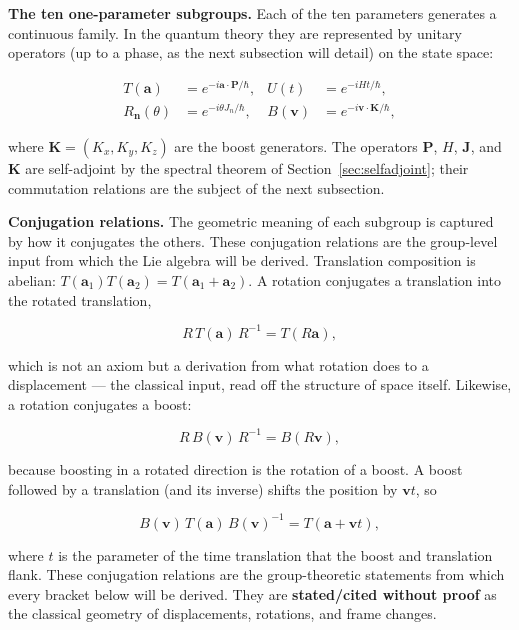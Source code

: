 \medskip\noindent\textbf{The ten one-parameter subgroups.} Each of the ten parameters generates a continuous family. In the quantum theory they are represented by unitary operators (up to a phase, as the next subsection will detail) on the state space:
\begin{linenomath}
\begin{align}
T(\bm a) &= e^{-i\bm a\cdot\bm P/\hbar}, & U(t) &= e^{-iHt/\hbar}, \\
R_{\bm n}(\theta) &= e^{-i\theta J_{n}/\hbar}, & B(\bm v) &= e^{-i\bm v\cdot\bm K/\hbar},
\label{eq:galilei-subgroups}
\end{align}
\end{linenomath}
where $\bm K = (K_x,K_y,K_z)$ are the boost generators. The operators $\bm P$, $H$, $\bm J$, and $\bm K$ are self-adjoint by the spectral theorem of Section~\ref{sec:selfadjoint}; their commutation relations are the subject of the next subsection.

\medskip\noindent\textbf{Conjugation relations.} The geometric meaning of each subgroup is captured by how it conjugates the others. These conjugation relations are the group-level input from which the Lie algebra will be derived. Translation composition is abelian: $T(\bm a_{1})T(\bm a_{2})=T(\bm a_{1}+\bm a_{2})$. A rotation conjugates a translation into the rotated translation,
\begin{linenomath}
\begin{equation}
R\,T(\bm a)\,R^{-1} = T(R\bm a),
\label{eq:rotation-translation-conjugation}
\end{equation}
\end{linenomath}
which is not an axiom but a derivation from what rotation does to a displacement --- the classical input, read off the structure of space itself. Likewise, a rotation conjugates a boost:
\begin{linenomath}
\begin{equation}
R\,B(\bm v)\,R^{-1} = B(R\bm v),
\label{eq:rotation-boost-conjugation}
\end{equation}
\end{linenomath}
because boosting in a rotated direction is the rotation of a boost. A boost followed by a translation (and its inverse) shifts the position by $\bm v t$, so
\begin{linenomath}
\begin{equation}
B(\bm v)\,T(\bm a)\,B(\bm v)^{-1} = T(\bm a + \bm v t),
\label{eq:boost-translation-conjugation}
\end{equation}
\end{linenomath}
where $t$ is the parameter of the time translation that the boost and translation flank. These conjugation relations are the group-theoretic statements from which every bracket below will be derived. They are \textbf{stated/cited without proof} as the classical geometry of displacements, rotations, and frame changes.

